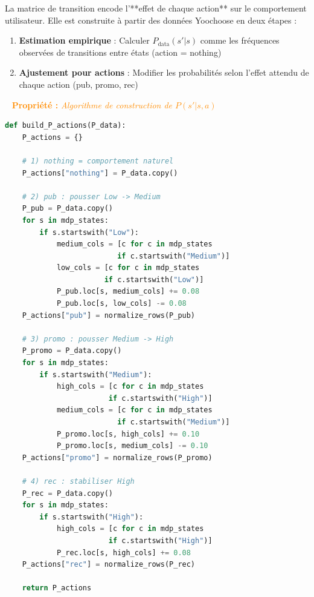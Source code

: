 \documentclass[11pt,a4paper]{article}
\newenvironment{propbox}[1]{%
  \vspace{3pt}\begin{framed}
  \noindent{\color{DarkOrange}\rule{0.3cm}{3pt}}~%
  \textcolor{DarkOrange}{\textbf{Propriété :} \textit{#1}}\\[3pt]}
  {\end{framed}\vspace{3pt}}
\begin{document}
La matrice de transition encode l'**effet de chaque action** sur le comportement utilisateur.
Elle est construite à partir des données Yoochoose en deux étapes :
 
\begin{enumerate}[leftmargin=1.5cm,itemsep=3pt]
  \item \textbf{Estimation empirique} : Calculer $P_{\text{data}}(s'|s)$ comme les
        fréquences observées de transitions entre états (action = nothing)
  \item \textbf{Ajustement pour actions} : Modifier les probabilités selon l'effet
        attendu de chaque action (pub, promo, rec)
\end{enumerate}
 
\begin{propbox}{Algorithme de construction de $P(s'|s,a)$}
\begin{lstlisting}[language=Python]
def build_P_actions(P_data):
    P_actions = {}
    
    # 1) nothing = comportement naturel
    P_actions["nothing"] = P_data.copy()
    
    # 2) pub : pousser Low -> Medium
    P_pub = P_data.copy()
    for s in mdp_states:
        if s.startswith("Low"):
            medium_cols = [c for c in mdp_states 
                          if c.startswith("Medium")]
            low_cols = [c for c in mdp_states 
                       if c.startswith("Low")]
            P_pub.loc[s, medium_cols] += 0.08
            P_pub.loc[s, low_cols] -= 0.08
    P_actions["pub"] = normalize_rows(P_pub)
    
    # 3) promo : pousser Medium -> High
    P_promo = P_data.copy()
    for s in mdp_states:
        if s.startswith("Medium"):
            high_cols = [c for c in mdp_states 
                        if c.startswith("High")]
            medium_cols = [c for c in mdp_states 
                          if c.startswith("Medium")]
            P_promo.loc[s, high_cols] += 0.10
            P_promo.loc[s, medium_cols] -= 0.10
    P_actions["promo"] = normalize_rows(P_promo)
    
    # 4) rec : stabiliser High
    P_rec = P_data.copy()
    for s in mdp_states:
        if s.startswith("High"):
            high_cols = [c for c in mdp_states 
                        if c.startswith("High")]
            P_rec.loc[s, high_cols] += 0.08
    P_actions["rec"] = normalize_rows(P_rec)
    
    return P_actions
\end{lstlisting}
\end{propbox}
 
\end{document}
